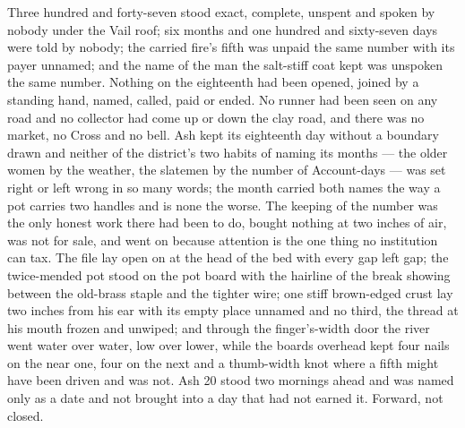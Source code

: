 Three hundred and forty-seven stood exact, complete, unspent and spoken by nobody under the Vail roof; six months and one hundred and sixty-seven days were told by nobody; the carried fire's fifth was unpaid the same number with its payer unnamed; and the name of the man the salt-stiff coat kept was unspoken the same number. Nothing on the eighteenth had been opened, joined by a standing hand, named, called, paid or ended. No runner had been seen on any road and no collector had come up or down the clay road, and there was no market, no Cross and no bell. Ash kept its eighteenth day without a boundary drawn and neither of the district's two habits of naming its months --- the older women by the weather, the slatemen by the number of Account-days --- was set right or left wrong in so many words; the month carried both names the way a pot carries two handles and is none the worse. The keeping of the number was the only honest work there had been to do, bought nothing at two inches of air, was not for sale, and went on because attention is the one thing no institution can tax. The file lay open on  at the head of the bed with every gap left gap; the twice-mended pot stood on the pot board with the hairline of the break showing between the old-brass staple and the tighter wire; one stiff brown-edged crust lay two inches from his ear with its empty place unnamed and no third, the thread at his mouth frozen and unwiped; and through the finger's-width door the river went water over water, low over lower, while the boards overhead kept four nails on the near one, four on the next and a thumb-width knot where a fifth might have been driven and was not. Ash 20 stood two mornings ahead and was named only as a date and not brought into a day that had not earned it. Forward, not closed.

